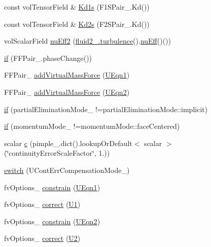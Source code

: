 \begin{DoxyCompactItemize}
const vol\+Tensor\+Field \& \hyperlink{UEqns__2p_8H_aa1b00e7ca6e3dff3ac8d9fec497ff62a}{Kd1s} (F1\+S\+Pair\+\_\+.\+Kd())
\item 
const vol\+Tensor\+Field \& \hyperlink{UEqns__2p_8H_a853f2977c4ca96ca44d537739d24d707}{Kd2s} (F2\+S\+Pair\+\_\+.\+Kd())
\item 
vol\+Scalar\+Field \hyperlink{UEqns__2p_8H_af0c0b1dc192a2846ed0d497c6b4b56a7}{nu\+Eff2} (\hyperlink{UEqns__2p_8H_a1769aacd25eec8e30f213b1c177e12d6}{fluid2\+\_\+.\+turbulence}().\hyperlink{UEqn__1pl_8H_a45b99c6eed207f4b52ba0f4a48682586}{nu\+Eff}()())
\item 
\hyperlink{UEqns__2p_8H_a97ae903740550c29a2c4daa299c86967}{if} (F\+F\+Pair\+\_\+.\+phase\+Change())
\item 
F\+F\+Pair\+\_\+ \hyperlink{UEqns__2p_8H_a5d47249e0353755ef05fa72ce53ed5b7}{add\+Virtual\+Mass\+Force} (\hyperlink{UEqns__2p_8H_aae13b369a8a095eff1fbd9502846e5ed}{U\+Eqn1})
\item 
F\+F\+Pair\+\_\+ \hyperlink{UEqns__2p_8H_a91493c7bfd156a6f4d2a7d1bad26fca6}{add\+Virtual\+Mass\+Force} (\hyperlink{UEqns__2p_8H_a22a244ef3f804b6129767149e4ff2e95}{U\+Eqn2})
\item 
\hyperlink{UEqns__2p_8H_af1e25f96fb77d3d5e95a4bfcfa302a5b}{if} (partial\+Elimination\+Mode\+\_\+ !=partial\+Elimination\+Mode\+::implicit)
\item 
\hyperlink{UEqns__2p_8H_adbc397c1ba3b678cf4aa2e28cff527d8}{if} (momentum\+Mode\+\_\+ !=momentum\+Mode\+::face\+Centered)
\item 
scalar \hyperlink{UEqns__2p_8H_a41a371debc8f4fa40469231470618dda}{c} (pimple\+\_\+.\+dict().lookup\+Or\+Default$<$ scalar $>$(\char`\"{}continuity\+Error\+Scale\+Factor\char`\"{}, 1.))
\item 
\hyperlink{UEqns__2p_8H_aee351757b3664beb7bf808cf73ab6447}{switch} (U\+Cont\+Err\+Compensation\+Mode\+\_\+)
\item 
fv\+Options\+\_\+ \hyperlink{UEqns__2p_8H_ac80de419cb7619e208e83703d65a25f3}{constrain} (\hyperlink{UEqns__2p_8H_aae13b369a8a095eff1fbd9502846e5ed}{U\+Eqn1})
\item 
fv\+Options\+\_\+ \hyperlink{UEqns__2p_8H_ac860d508f187a8c6f977225a619722d1}{correct} (\hyperlink{UEqns__2p_8H_a36d208f2338b1dd1ec90b2b1333d5f42}{U1})
\item 
fv\+Options\+\_\+ \hyperlink{UEqns__2p_8H_a6ba298cfb6cb3a2323e9d07a6d33fa05}{constrain} (\hyperlink{UEqns__2p_8H_a22a244ef3f804b6129767149e4ff2e95}{U\+Eqn2})
\item 
fv\+Options\+\_\+ \hyperlink{UEqns__2p_8H_a5d6c5de5f4047930e6ba910e27399db8}{correct} (\hyperlink{UEqns__2p_8H_af55bc79119bfe60c39e86c5ddf988e7a}{U2})
\end{DoxyCompactItemize}
